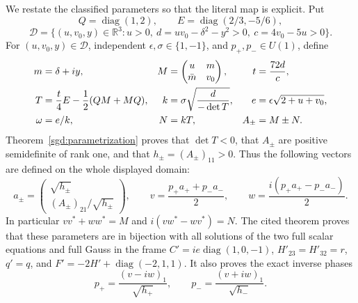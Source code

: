 We restate the classified parameters so that the literal map is explicit.
Put
\[
 Q=\operatorname{diag}(1,2),\qquad E=\operatorname{diag}(2/3,-5/6),
\]
\[
 \mathcal D=\{(u,v_0,y)\in\mathbb R^3:
 u>0,\ d=uv_0-\delta^2-y^2>0,\ c=4v_0-5u>0\}.
\]
For $(u,v_0,y)\in\mathcal D$, independent
$\epsilon,\sigma\in\{1,-1\}$, and $p_+,p_-\in U(1)$, define
\begin{align}
 m&=\delta+iy,&
 M&=\begin{pmatrix}u&m\\\bar m&v_0\end{pmatrix},&
 t&=\frac{72d}{c},\notag\\
 T&=\frac t4E-\frac12(QM+MQ),&
 k&=\sigma\sqrt{\frac d{-\det T}},&
 e&=\epsilon\sqrt{2+u+v_0},\notag\\
 \omega&=e/k,&N&=kT,&A_\pm&=M\pm N.
 \label{sgd:literal-addon:parameters}
\end{align}
Theorem~\ref{sgd:parametrization} proves that $\det T<0$,
that $A_\pm$ are positive semidefinite of rank one, and that
$h_\pm=(A_\pm)_{11}>0$. Thus the following vectors are defined
on the whole displayed domain:
\begin{equation}
 a_\pm=\begin{pmatrix}
 \sqrt{h_\pm}\\(A_\pm)_{21}/\sqrt{h_\pm}
 \end{pmatrix},\qquad
 v=\frac{p_+a_++p_-a_-}{2},\qquad
 w=\frac{i(p_+a_+-p_-a_-)}{2}.
 \label{sgd:literal-addon:vectors}
\end{equation}
In particular $vv^*+ww^*=M$ and $i(vw^*-wv^*)=N$.
The cited theorem proves that these parameters are in bijection
with all solutions of the two full scalar equations and full Gauss
in the frame $C'=ie\operatorname{diag}(1,0,-1)$,
$H'_{23}=H'_{32}=r$, $q'=q$, and
$F'=-2H'+\operatorname{diag}(-2,1,1)$.
It also proves the exact inverse phases
\begin{equation}
 p_+=\frac{(v-iw)_1}{\sqrt{h_+}},\qquad
 p_-=\frac{(v+iw)_1}{\sqrt{h_-}}.
 \label{sgd:literal-addon:phase-inverse}
\end{equation}

